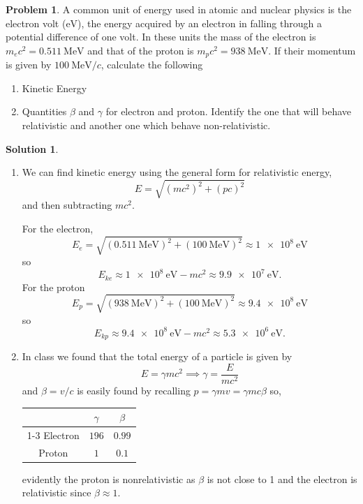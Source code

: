\documentclass[10pt]{article}
\theoremstyle{definition}
\newtheorem{problem}{Problem}
\newtheorem{soln}{Solution}
\begin{document}
\begin{problem}
A common unit of energy used in atomic and nuclear physics is the electron volt ($\unit{\electronvolt}$), the energy
acquired by an electron in falling through a potential difference of one volt. In these units
the mass of the electron is $m_ec^2=\qty{0.511}{\mega\electronvolt}$ and that of the
proton is $m_pc^2=\qty{938}{\mega\electronvolt}$. If their momentum is given by $\qty{100}{\mega\electronvolt}/c$, calculate the following
\begin{enumerate}[label=(\roman*)]
  \item Kinetic Energy
  \item Quantities $\beta$ and $\gamma$ for electron and proton. Identify the one that will behave relativistic
        and another one which behave non-relativistic.
\end{enumerate}
\end{problem}
\begin{soln}
  \begin{enumerate}[label=(\roman*)]
    \item We can find kinetic energy using the general form for relativistic energy,
          $$E=\sqrt{(mc^2)^2+(pc)^2}$$
          and then subtracting $mc^2$.

          For the electron,
          $$E_e=\sqrt{(\qty{0.511}{\mega\electronvolt})^2+(\qty{100}{\mega\electronvolt})^2}\approx \qty{1e8}{\electronvolt}$$
          so
          $$E_{ke}\approx \qty{1e8}{\electronvolt}-mc^2\approx\qty{9.9e7}{\electronvolt}.$$
          For the proton
          $$E_p=\sqrt{(\qty{938}{\mega\electronvolt})^2+(\qty{100}{\mega\electronvolt})^2}\approx \qty{9.4e8}{\electronvolt}$$
          so
          $$E_{kp}\approx \qty{9.4e8}{\electronvolt}-mc^2\approx\qty{5.3e6}{\electronvolt}.$$
    \item In class we found that the total energy of a particle is given by
          $$E=\gamma mc^2\implies \gamma = \frac{E}{mc^2}$$
          and $\beta=v/c$ is easily found by recalling $p=\gamma mv=\gamma mc\beta$ so,
          \begin{center}
            \begin{tabular}{c | c c }
                       & $\gamma$ & $\beta$ \\
              \cline{1-3}
              Electron & $196$    & $0.99$  \\
              Proton   & $1$      & $0.1$
            \end{tabular}
          \end{center}
          evidently the proton is nonrelativistic as $\beta$ is not close to 1 and the electron is relativistic since $\beta \approx 1$.
  \end{enumerate}
\end{soln}
\end{document}
